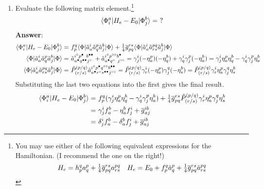 \documentclass[11pt]{article}
\numberwithin{equation}{section}
\begin{document}
\begin{enumerate}
\newpage
\item
  Evaluate the following matrix element.\footnote{You may use either of the following equivalent expressions for the Hamiltonian. (I recommend the one on the right!)
  \begin{align*}
    H_e
  =
    h_p^q
    a^p_q
  +
    \tfrac{1}{4}
    \overline{g}_{pq}^{rs}
    a^{pq}_{rs}
  &&
    H_e
  =
    E_0
  +
    f_p^q
    \tilde{a}^p_q
  +
    \tfrac{1}{4}
    \overline{g}_{pq}^{rs}
    \tilde{a}^{pq}_{rs}
  \end{align*}
  }
  \begin{align*}
    \langle\Phi _i^a|H_e - E_0|\Phi _j^b\rangle
  =
    \,\,?
  \end{align*}
  \textbf{Answer}:
  \begin{align*}
    \ip{\F_i^a|H_e - E_0|\F_j^b}
  =&\
    f_p^q
    \ip{\F|
      \tl{a}^i_a
      \tl{a}^p_q
      \tl{a}^b_j
    |\F}
  +
    \tfr{1}{4}
    \ol{g}_{pq}^{rs}
    \ip{\F|
      \tl{a}^i_a
      \tl{a}^{pq}_{rs}
      \tl{a}^b_j
    |\F}
  \\
    \ip{\F|
      \tl{a}^i_a
      \tl{a}^p_q
      \tl{a}^b_j
    |\F}
  =&\
    \tl{a}^{i^\hole p^{\ptcl\phantom{\ptcl}} b^{\ptcl\ptcl}}
          _{a^\ptcl q^{\ptcl\ptcl} j^\hole}
  +
    \tl{a}^{i^\hole p^{\hole\hole} b^\ptcl}
          _{a^\ptcl q^{\hole\phantom{\hole}} j^{\hole\hole}}
  =
    \g^i_j
    (-\h^p_a)
    (-\h^b_q)
  +
    \g^i_q
    \g^p_j
    (-\h^b_a)
  =
    \g^i_j
    \h^p_a
    \h^b_q
  -
    \g^i_q
    \g^p_j
    \h^b_a
  \\
    \ip{\F|
      \tl{a}^i_a
      \tl{a}^{pq}_{rs}
      \tl{a}^b_j
    |\F}
  =&\
    \op{P}^{(p/q)}_{(r/s)}
    \tl{a}^{i^\hole p^\ptcl q^{\hole\hole} b^{\ptcl\ptcl}}
          _{a^\ptcl r^\hole s^{\ptcl\ptcl} j^{\hole\hole}}
  =
    \op{P}^{(p/q)}_{(r/s)}
    \g^i_r
    (-\h^p_a)
    \g^q_j
    (-\h^b_s)
  =
    \op{P}^{(p/q)}_{(r/s)}
    \g^i_r
    \h^p_a
    \g^q_j
    \h^b_s
  \end{align*}
  Substituting the last two equations into the first gives the final result.
  \begin{align*}
    \langle\Phi _i^a|H_e - E_0|\Phi _j^b\rangle
  =&\
    f_p^q
    (
      \gamma ^i_j
      \eta ^p_a
      \eta ^b_q
    -
      \gamma ^i_q
      \gamma ^p_j
      \eta ^b_a
    )
  +
    \tfrac{1}{4}
    \overline{g}_{pq}^{rs}
    \hat{P}^{(p/q)}_{(r/s)}
    \gamma ^i_r
    \eta ^p_a
    \gamma ^q_j
    \eta ^b_s
  \\=&\
    \gamma ^i_j
    f_a^b
  -
    \eta ^b_a
    f_j^i
  +
    \overline{g}_{aj}^{ib}
  \\=&\
    \delta ^i_j
    f_a^b
  -
    \delta ^b_a
    f_j^i
  +
    \overline{g}_{aj}^{ib}
  \end{align*}

\end{enumerate}
\end{document}
